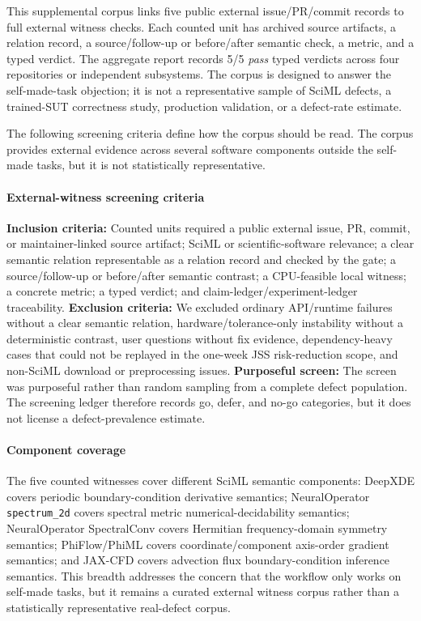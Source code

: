 \documentclass[preprint,12pt]{elsarticle}
\begin{document}
This supplemental corpus links five public external issue/PR/commit records to
full external witness checks. Each counted unit has archived source artifacts,
a relation record, a source/follow-up or before/after semantic check, a metric, and a
typed verdict. The aggregate report records 5/5 \emph{pass} typed verdicts
across four repositories or independent subsystems. The corpus is
designed to answer the self-made-task objection; it is not a representative
sample of SciML defects, a trained-SUT correctness study, production validation,
or a defect-rate estimate.

The following screening criteria define how the corpus should be read. The
corpus provides external evidence across several software components outside
the self-made tasks, but it is not statistically representative.

\paragraph{External-witness screening criteria}
\textbf{Inclusion criteria:} Counted units required a public external issue,
PR, commit, or maintainer-linked source artifact; SciML or
scientific-software relevance; a clear semantic relation representable as a relation record and checked by the gate; a source/follow-up or before/after semantic contrast; a
CPU-feasible local witness; a concrete metric; a typed verdict; and
claim-ledger/experiment-ledger traceability.
\textbf{Exclusion criteria:} We excluded ordinary API/runtime failures without
a clear semantic relation, hardware/tolerance-only instability without a
deterministic contrast, user questions without fix evidence, dependency-heavy
cases that could not be replayed in the one-week JSS risk-reduction scope, and
non-SciML download or preprocessing issues. \textbf{Purposeful screen:} The
screen was purposeful rather than random sampling from a complete defect
population. The screening ledger therefore records go, defer, and no-go
categories, but it does not license a defect-prevalence estimate.

\paragraph{Component coverage}
The five counted witnesses cover different SciML semantic components:
DeepXDE covers periodic boundary-condition derivative semantics;
NeuralOperator \texttt{spectrum\_2d} covers spectral metric numerical-decidability semantics; NeuralOperator SpectralConv covers
Hermitian frequency-domain symmetry semantics; PhiFlow/PhiML covers
coordinate/component axis-order gradient semantics; and JAX-CFD covers
advection flux boundary-condition inference semantics. This breadth addresses
the concern that the workflow only works on self-made tasks, but it remains a
curated external witness corpus rather than a statistically representative
real-defect corpus.
\end{document}
